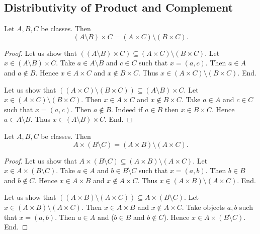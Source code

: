 \documentclass[10pt]{article}
\begin{document}
  \subsection{Distributivity of Product and Complement}

  \begin{forthel}
    \begin{proposition}
      Let $A, B, C$ be classes.
      Then \[ (A \setminus B) \times C = (A \times C) \setminus (B \times C). \]
    \end{proposition}
    \begin{proof}
      Let us show that $((A \setminus B) \times C) \subseteq
      (A \times C) \setminus (B \times C).$ %
        Let $x \in (A \setminus B) \times C$.
        Take $a \in A \setminus B$ and $c \in C$ such that $x = (a, c)$.
        Then $a \in A$ and $a \notin B$.
        Hence $x \in A \times C$ and $x \notin B \times C$.
        Thus $x \in (A \times C) \setminus (B \times C)$.
      End.

      Let us show that $((A \times C) \setminus (B \times C)) \subseteq
      (A \setminus B) \times C$. %
        Let $x \in (A \times C) \setminus (B \times C)$.
        Then $x \in A \times C$ and $x \notin B \times C$.
        Take $a \in A$ and $c \in C$ such that $x = (a, c)$.
        Then $a \notin B$.
        Indeed if $a \in B$ then $x \in B \times C$.
        Hence $a \in A \setminus B$.
        Thus $x \in (A \setminus B) \times C$.
      End.
    \end{proof}
  \end{forthel}

  \begin{forthel}
    \begin{proposition}
      Let $A, B, C$ be classes.
      Then \[ A \times (B \setminus C) = (A \times B) \setminus (A \times C). \]
    \end{proposition}
    \begin{proof}
      Let us show that $A \times (B \setminus C) \subseteq
      (A \times B) \setminus (A \times C)$.
        Let $x \in A \times (B \setminus C)$.
        Take $a \in A$ and $b \in B \setminus C$ such that $x = (a, b)$.
        Then $b \in B$ and $b \notin C$.
        Hence $x \in A \times B$ and $x \notin A \times C$.
        Thus $x \in (A \times B) \setminus (A \times C)$.
      End.

      Let us show that $((A \times B) \setminus (A \times C)) \subseteq
      A \times (B \setminus C)$. %
        Let $x \in (A \times B) \setminus (A \times C)$.
        Then $x \in A \times B$ and $x \notin A \times C$.
        Take objects $a, b$ such that $x = (a, b)$.
        Then $a \in A$ and ($b \in B$ and $b \notin C$).
        Hence $x \in A \times (B \setminus C)$.
      End.
    \end{proof}
  \end{forthel}
\end{document}
